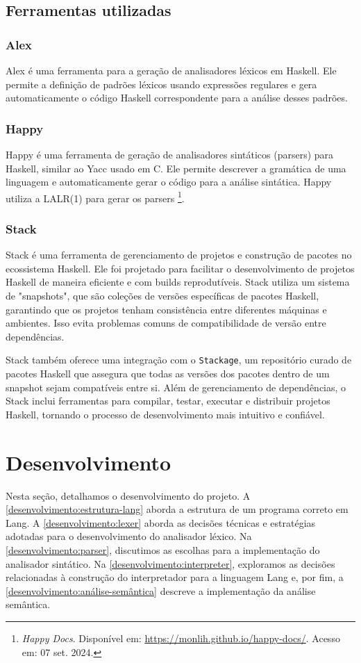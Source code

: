\documentclass{article}
\begin{document}
\subsection{Ferramentas utilizadas}
\subsubsection{Alex}
Alex é uma ferramenta para a geração de analisadores léxicos em Haskell. Ele permite a definição de padrões léxicos usando expressões regulares e gera automaticamente o código Haskell correspondente para a análise desses padrões.

\subsubsection{Happy}
Happy é uma ferramenta de geração de analisadores sintáticos (parsers) para Haskell, similar ao Yacc usado em C. Ele permite descrever a gramática de uma linguagem e automaticamente gerar o código para a análise sintática. Happy utiliza a LALR(1) para gerar os parsers \footnote{\textit{Happy Docs}. Disponível em: \url{https://monlih.github.io/happy-docs/}. Acesso em: 07 set. 2024.}.

\subsubsection{Stack}
Stack é uma ferramenta de gerenciamento de projetos e construção de pacotes no ecossistema Haskell. Ele foi projetado para facilitar o desenvolvimento de projetos Haskell de maneira eficiente e com builds reprodutíveis. Stack utiliza um sistema de "snapshots", que são coleções de versões específicas de pacotes Haskell, garantindo que os projetos tenham consistência entre diferentes máquinas e ambientes. Isso evita problemas comuns de compatibilidade de versão entre dependências.

Stack também oferece uma integração com o \texttt{Stackage}, um repositório curado de pacotes Haskell que assegura que todas as versões dos pacotes dentro de um snapshot sejam compatíveis entre si. Além de gerenciamento de dependências, o Stack inclui ferramentas para compilar, testar, executar e distribuir projetos Haskell, tornando o processo de desenvolvimento mais intuitivo e confiável.

\section{Desenvolvimento}
Nesta seção, detalhamos o desenvolvimento do projeto. A \autoref{desenvolvimento:estrutura-lang} aborda a estrutura de um programa correto em Lang. A \autoref{desenvolvimento:lexer} aborda as decisões técnicas e estratégias adotadas para o desenvolvimento do analisador léxico. Na \autoref{desenvolvimento:parser}, discutimos as escolhas para a implementação do analisador sintático. Na \autoref{desenvolvimento:interpreter}, exploramos as decisões relacionadas à construção do interpretador para a linguagem Lang e, por fim, a \autoref{desenvolvimento:análise-semântica} descreve a implementação da análise semântica.
\end{document}
